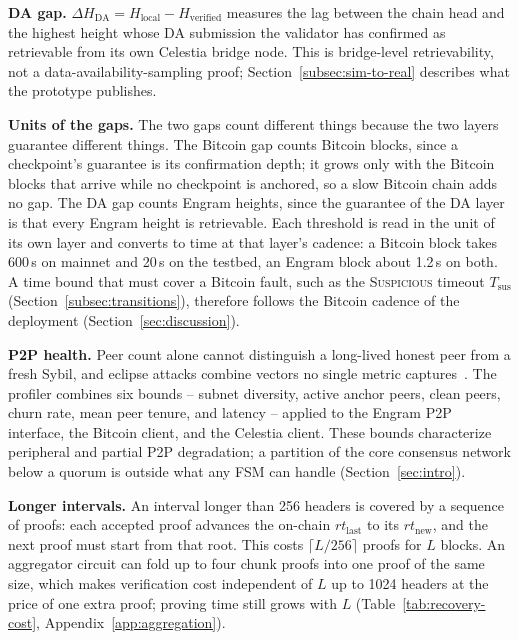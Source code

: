 \textbf{DA gap.} $\Delta H_{\text{DA}} = H_{\text{local}} -
H_{\text{verified}}$ measures the lag between the chain head and the highest
height whose DA submission the validator has confirmed as retrievable from
its own Celestia bridge node. This is bridge-level retrievability, not a
data-availability-sampling proof; Section~\ref{subsec:sim-to-real} describes
what the prototype publishes.

\textbf{Units of the gaps.} The two gaps count different things because the two
layers guarantee different things. The Bitcoin gap counts Bitcoin blocks, since a
checkpoint's guarantee is its confirmation depth; it grows only with the Bitcoin
blocks that arrive while no checkpoint is anchored, so a slow Bitcoin chain adds no
gap. The DA gap counts Engram heights, since the guarantee of the DA layer is that
every Engram height is retrievable. Each threshold is read in the unit of its own
layer and converts to time at that layer's cadence: a Bitcoin block takes 600\,s on
mainnet and 20\,s on the testbed, an Engram block about 1.2\,s on both. A time bound
that must cover a Bitcoin fault, such as the \textsc{Suspicious} timeout
$T_{\text{sus}}$ (Section~\ref{subsec:transitions}), therefore follows the Bitcoin
cadence of the deployment (Section~\ref{sec:discussion}).

\textbf{P2P health.} Peer count alone cannot distinguish a long-lived honest
peer from a fresh Sybil, and eclipse attacks combine vectors no single
metric captures~\cite{rehman2025eclipse,heilman2015eclipse}. The profiler
combines six bounds -- subnet diversity, active anchor peers, clean peers,
churn rate, mean peer tenure, and latency -- applied to the Engram P2P
interface, the Bitcoin client, and the Celestia client. These bounds
characterize peripheral and partial P2P degradation; a partition of the
core consensus network below a quorum is outside what any FSM can handle
(Section~\ref{sec:intro}).


\textbf{Longer intervals.} An interval longer than 256 headers is covered by
a sequence of proofs: each accepted proof advances the on-chain
$\mathit{rt}_{\text{last}}$ to its $\mathit{rt}_{\text{new}}$, and the next
proof must start from that root. This costs $\lceil L/256 \rceil$ proofs for
$L$ blocks. An aggregator circuit can fold up to four chunk proofs into one
proof of the same size, which makes verification cost independent of $L$ up to
1024 headers at the price of one extra proof; proving time still grows with $L$
(Table~\ref{tab:recovery-cost}, Appendix~\ref{app:aggregation}).

